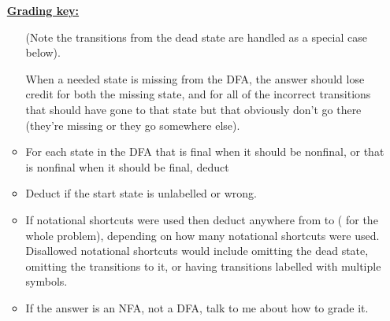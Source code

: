 \documentclass[11pt,fleqn]{article}
\begin{document}
\begin{enumerate}
\begin{info}{\textbf{\underline{Grading key:}}}
\begin{itemize}
                    (Note the transitions from the dead state are handled as
                    a special case below).

                    When a needed state is missing from the DFA, the answer
                    should lose credit for both the missing state, and for
                    all of the incorrect transitions that should have gone
                    to that state but that obviously don't go there
                    (they're missing or they go somewhere else).

              \item For each state in the DFA that is final when it should
                    be nonfinal, or that is nonfinal when it should be
                    final, deduct 

              \item Deduct  if the start state is unlabelled or
                    wrong.

              \item If notational shortcuts were used then deduct anywhere
                    from  to ( for the whole problem),
                    depending on how many notational shortcuts were used.
                    Disallowed notational shortcuts would include omitting
                    the dead state, omitting the transitions to it, or
                    having transitions labelled with multiple symbols.

              \item If the answer is an NFA, not a DFA, talk to me about how
                    to grade it.


\end{itemize}
\end{info}
\end{enumerate}
\end{document}
